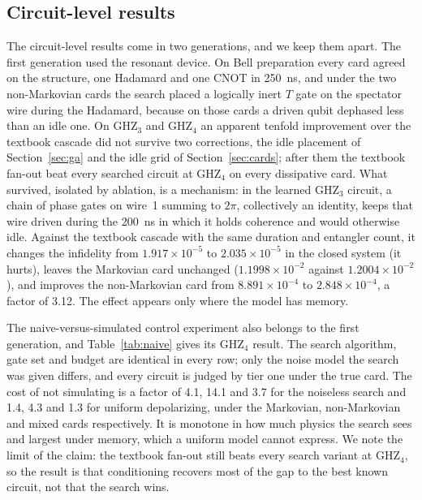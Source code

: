 \documentclass[10pt]{article}
\begin{document}
\subsection{Circuit-level results}

The circuit-level results come in two generations, and we keep them apart.
The first generation used the resonant device. On Bell preparation every card
agreed on the structure, one Hadamard and one CNOT in 250~ns, and under the two
non-Markovian cards the search placed a logically inert $T$ gate on the
spectator wire during the Hadamard, because on those cards a driven qubit
dephased less than an idle one. On GHZ$_3$ and GHZ$_4$ an apparent tenfold
improvement over the textbook cascade did not survive two corrections, the
idle placement of Section~\ref{sec:ga} and the idle grid of
Section~\ref{sec:cards}; after them the textbook fan-out beat every searched
circuit at GHZ$_4$ on every dissipative card. What survived, isolated by
ablation, is a mechanism: in the learned GHZ$_3$ circuit, a chain of phase gates
on wire~1 summing to $2\pi$, collectively an identity, keeps that wire driven
during the 200~ns in which it holds coherence and would otherwise idle. Against
the textbook cascade with the same duration and entangler count, it changes the
infidelity from $1.917\times10^{-5}$ to $2.035\times10^{-5}$ in the closed
system (it hurts), leaves the Markovian card unchanged ($1.1998\times10^{-2}$
against $1.2004\times10^{-2}$), and improves the non-Markovian card from
$8.891\times10^{-4}$ to $2.848\times10^{-4}$, a factor of 3.12. The effect
appears only where the model has memory.

The naive-versus-simulated control experiment also belongs to the first
generation, and Table~\ref{tab:naive} gives its GHZ$_4$ result. The search
algorithm, gate set and budget are identical in every row; only the noise
model the search was given differs, and every circuit is judged by tier one
under the true card. The cost of not simulating is a factor of 4.1, 14.1 and
3.7 for the noiseless search and 1.4, 4.3 and 1.3 for uniform depolarizing,
under the Markovian, non-Markovian and mixed cards respectively. It is
monotone in how much physics the search sees and largest under memory, which a
uniform model cannot express. We note the limit of the claim: the textbook
fan-out still beats every search variant at GHZ$_4$, so the result is that
conditioning recovers most of the gap to the best known circuit, not that the
search wins.
\end{document}
